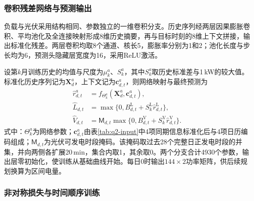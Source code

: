 \subsubsection{卷积残差网络与预测输出}

负载与光伏采用结构相同、参数独立的一维卷积分支。历史序列经两层因果膨胀卷积、平均池化及全连接映射形成8维历史摘要，再与目标时刻的8维上下文拼接，输出标准化残差。两层卷积均取8个通道、核长5，膨胀率分别为1和2；池化长度与步长均为6，预测头隐藏层宽度为16，采用ReLU激活。

设第$k$月训练历史的均值与尺度为$\mu_k^a$、$S_k^a$，其中$S_k^a$取历史标准差与1\,kW的较大值。标准化历史序列记为$\mathbf X_d^a$，上下文记为$\mathbf c_{d,t}^a$，则网络映射与最终预测为
\begin{equation}\label{eq:q2-network}
 \begin{aligned}
 \widehat r^a_{d,t}&=f_{\Theta_k^a}(\mathbf X_d^a,\mathbf c_{d,t}^a),\\
 \widehat L_{d,t}&=\max\{0,B^{\mathrm L}_{d,t}+S_k^{\mathrm L}\widehat r^{\mathrm L}_{d,t}\},\\
 \widehat V_{d,t}&=\mathsf M_{d,t}\max\{0,B^{\mathrm V}_{d,t}+S_k^{\mathrm V}\widehat r^{\mathrm V}_{d,t}\}.
 \end{aligned}
\end{equation}
式中：$\Theta_k^a$为网络参数；$\mathbf c_{d,t}^a$由表\ref{tab:q2-input}中4项同期信息标准化后与4项日历编码组成；$\mathsf M_{d,t}$为光伏可发电时段掩码。该掩码取过去28个完整日正发电时段的并集，并向两侧各扩展20\,min，集合内取1，其余取0。两个分支合计4930个参数，输出层零初始化，使训练从基础曲线开始。每日0时输出$144\times2$功率矩阵，供后续规划换算为区间电量。

\subsubsection{非对称损失与时间顺序训练}


